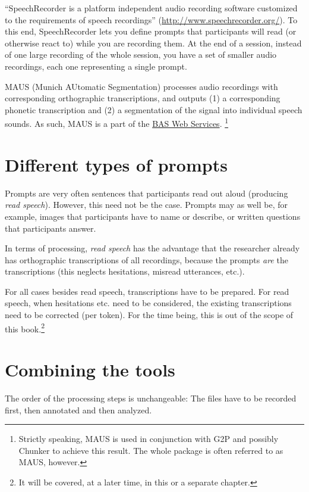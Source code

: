 \documentclass[]{book}
\let\rmarkdownfootnote\footnote%
\def\footnote{\protect\rmarkdownfootnote}
\theoremstyle{definition}
\theoremstyle{definition}
\theoremstyle{definition}
\theoremstyle{remark}
\begin{document}
``SpeechRecorder is a platform independent audio recording software
customized to the requirements of speech recordings''
(\url{http://www.speechrecorder.org/}). To this end, SpeechRecorder lets
you define prompts that participants will read (or otherwise react to)
while you are recording them. At the end of a session, instead of one
large recording of the whole session, you have a set of smaller audio
recordings, each one representing a single prompt.

MAUS (Munich AUtomatic Segmentation) processes audio recordings with
corresponding orthographic transcriptions, and outputs (1) a
corresponding phonetic transcription and (2) a segmentation of the
signal into individual speech sounds. As such, MAUS is a part of the
\href{https://clarin.phonetik.uni-muenchen.de/BASWebServices}{BAS Web
Services}. \footnote{Strictly speaking, MAUS is used in conjunction with
  G2P and possibly Chunker to achieve this result. The whole package is
  often referred to as MAUS, however.}

\section{Different types of prompts}\label{different-types-of-prompts}

Prompts are very often sentences that participants read out aloud
(producing \emph{read speech}). However, this need not be the case.
Prompts may as well be, for example, images that participants have to
name or describe, or written questions that participants answer.

In terms of processing, \emph{read speech} has the advantage that the
researcher already has orthographic transcriptions of all recordings,
because the prompts \emph{are} the transcriptions (this neglects
hesitations, misread utterances, etc.).

For all cases besides read speech, transcriptions have to be prepared.
For read speech, when hesitations etc. need to be considered, the
existing transcriptions need to be corrected (per token). For the time
being, this is out of the scope of this book.\footnote{It will be
  covered, at a later time, in this or a separate chapter.}

\section{Combining the tools}\label{combining-the-tools}

The order of the processing steps is unchangeable: The files have to be
recorded first, then annotated and then analyzed.
\end{document}
